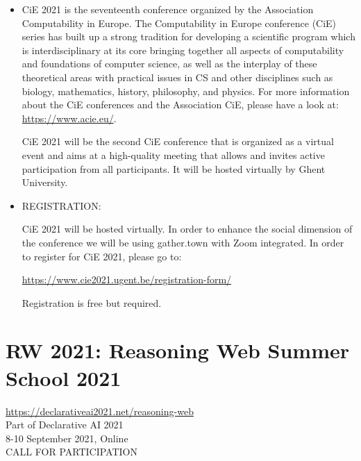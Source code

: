 \documentclass[prodmode,acmtecs]{acmsmall} %
\begin{document}
\begin{itemize}\item  CiE 2021 is the seventeenth conference organized by the Association Computability in Europe. The Computability in Europe conference (CiE) series has built up a strong tradition for developing a scientific program which is interdisciplinary at its core bringing together all aspects of computability and foundations of computer science, as well as the interplay of these theoretical areas with practical issues in CS and other disciplines such as biology, mathematics, history, philosophy, and physics. For more information about the CiE conferences and the Association CiE, please have a look at: \href{https://www.acie.eu/}{https://www.acie.eu/}.  
 
  CiE 2021 will be the second CiE conference that is organized as a virtual event and aims at a high-quality meeting that allows and invites active participation from all participants. It will be hosted virtually by Ghent University. 
 
\item  REGISTRATION:  
 
  CiE 2021 will be hosted virtually. In order to enhance the social dimension of the conference we will be using gather.town with Zoom integrated. In order to register for CiE 2021, please go to: 
 
  \href{https://www.cie2021.ugent.be/registration-form/}{https://www.cie2021.ugent.be/registration-form/} 
 
  Registration is free but required. 
 
\end{itemize}\section{RW 2021: Reasoning Web Summer School 2021}\label{RW2021}  \href{https://declarativeai2021.net/reasoning-web}{https://declarativeai2021.net/reasoning-web}\\ 
  Part of Declarative AI 2021\\ 
  8-10 September 2021, Online \\ 
CALL FOR PARTICIPATION 
\end{document}
